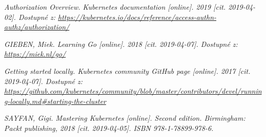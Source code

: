 \begin{thebibliography}{10}
	\emph{Authorization Overview. Kubernetes documentation [online]. 2019 [cit. 2019-04-02]. Dostupné z: \url{https://kubernetes.io/docs/reference/access-authn-authz/authorization/}}

	\emph{GIEBEN, Miek. Learning Go [online]. 2018 [cit. 2019-04-07]. Dostupné z: \url{https://miek.nl/go/}}

	\emph{Getting started locally. Kubernetes community GitHub page [online]. 2017 [cit. 2019-04-07]. Dostupné z: \url{https://github.com/kubernetes/community/blob/master/contributors/devel/running-locally.md#starting-the-cluster}}

	\emph{SAYFAN, Gigi. Mastering Kubernetes [online]. Second edition. Birmingham: Packt publishing, 2018 [cit. 2019-04-05]. ISBN 978-1-78899-978-6.}
\end{thebibliography}

